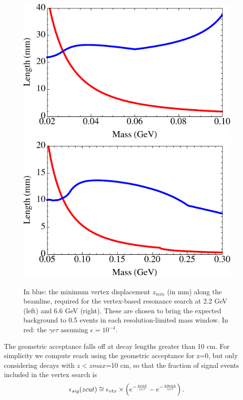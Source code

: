 \begin{figure}
\includegraphics[scale=0.8]{reach/decay-lengths-2pt2.pdf}
\includegraphics[scale=0.8]{reach/decay-lengths-6pt6.pdf}
\caption{In blue:  the minimum vertex displacement $z_{min}$ (in mm) along the beamline, required for 
the vertex-based resonance search at 2.2 GeV (left) and 6.6 GeV (right).  These are chosen 
to bring the expected background to 0.5 events in each resolution-limited mass window. 
 In red:  the $\gamma c\tau$ assuming $\epsilon=10^{-4}$.}
\label{fig:vtxLength}
\end{figure} 


 The geometric acceptance falls off at  decay lengths greater than 10 cm.  
For simplicity we compute reach using the geometric acceptance for z=0, but only considering 
decays with $z<zmax$=10 cm, so that the fraction of signal events included in the vertex search is
\begin{equation}
\epsilon_{sig} (zcut) \cong \epsilon_{vtx} \times\left (e^{-{{zcut} \over {\gamma c\tau}}} - e^{-{{zmax} \over {\gamma c\tau}}}\right).
\end{equation}

